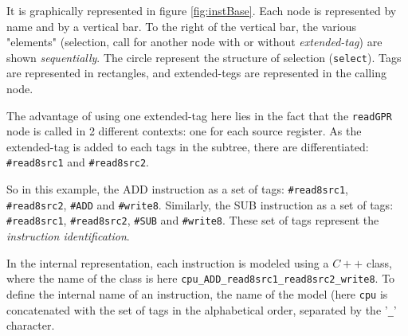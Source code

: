 It is graphically represented in figure \ref{fig:instBase}. Each node is represented by name and by a vertical bar. To the right of the vertical bar, the various "elements" (selection, call for another node with or without \emph{extended-tag}) are shown \emph{sequentially}. The circle represent the structure of selection (\texttt{select}). Tags are represented in rectangles, and extended-tegs are represented in the calling node.

The advantage of using one extended-tag here lies in the fact that the \texttt{readGPR} node is called in 2 different contexts: one for each source register. As the extended-tag is added to each tags in the subtree, there are differentiated: \texttt{\#read8src1} and \texttt{\#read8src2}.

So in this example, the ADD instruction as a set of tags:  \texttt{\#read8src1}, \texttt{\#read8src2}, \texttt{\#ADD} and \texttt{\#write8}.
Similarly, the SUB instruction as a set of tags: \texttt{\#read8src1}, \texttt{\#read8src2}, \texttt{\#SUB} and \texttt{\#write8}. These set of tags represent the \emph{instruction identification}.

In the internal representation, each instruction is modeled using a $C++$ class, where the name of the class is here  \texttt{cpu\_ADD\_read8src1\_read8src2\_write8}. To define the internal name of an instruction, the name of the model (here \texttt{cpu} is concatenated with the set of tags in the alphabetical order, separated by the '\texttt{\_}' character.

